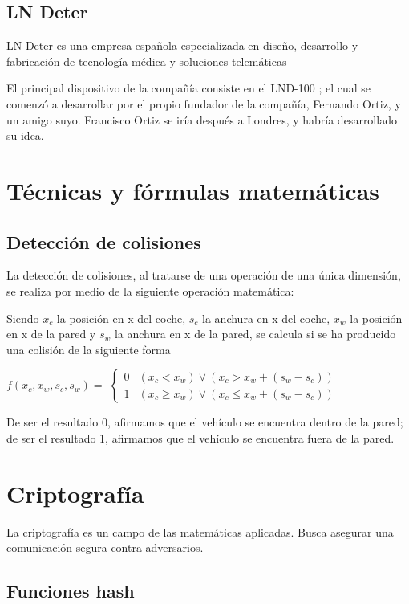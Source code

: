 \documentclass[12pt,a4paper,twoside,openright]{book}
\begin{document}
\subsection{LN Deter}


LN Deter es una empresa española especializada en diseño, desarrollo y fabricación de tecnología médica y soluciones telemáticas \cite{lndeter2}

El principal dispositivo de la compañía consiste en el LND-100 \cite{lndeter1}; el cual se comenzó a desarrollar por el propio fundador de la compañía, Fernando Ortiz, y un amigo suyo. Francisco Ortiz se iría después a Londres, y habría desarrollado su idea. \cite{lndeter3}



\section{Técnicas y fórmulas matemáticas}

\subsection{Detección de colisiones}

La detección de colisiones, al tratarse de una operación de una única dimensión, se realiza por medio de la siguiente operación matemática:

Siendo $x_c$ la posición en x del coche, $s_c$ la anchura en x del coche, $x_w$ la posición en x de la pared y $s_w$ la anchura en x de la pared, se calcula si se ha producido una colisión de la siguiente forma

$f(x_c,x_w,s_c,s_w) =$ $\begin{cases}0 & (x_c < x_w) \lor (x_c > x_w+(s_w-s_c))\\ 1 & (x_c \geq x_w) \lor (x_c \leq x_w+(s_w-s_c)) \end{cases}$

De ser el resultado 0, afirmamos que el vehículo se encuentra dentro de la pared; de ser el resultado 1, afirmamos que el vehículo se encuentra fuera de la pared.

\section{Criptografía}

La criptografía es un campo de las matemáticas aplicadas. Busca asegurar una comunicación segura contra adversarios.

\subsection{Funciones hash}
\end{document}
